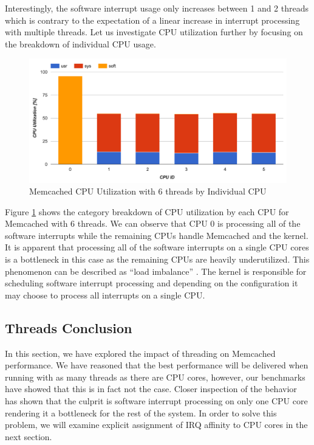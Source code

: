 Interestingly, the software interrupt usage only increases between 1 and 2 threads which is contrary to the expectation of a linear increase in interrupt processing with multiple threads. Let us investigate CPU utilization further by focusing on the breakdown of individual CPU usage.

\begin{figure}[h]
    \includegraphics[width=\textwidth]{./res2/m_threads_cpu_individual.png}
    \caption{Memcached CPU Utilization with 6 threads by Individual CPU}
    \label{fig:m_threads_cpu_individual}
\end{figure}

Figure \ref{fig:m_threads_cpu_individual} shows the category breakdown of CPU utilization by each CPU for Memcached with 6 threads. We can observe that CPU 0 is processing all of the software interrupts while the remaining CPUs handle Memcached and the kernel. It is apparent that processing all of the software interrupts on a single CPU cores is a bottleneck in this case as the remaining CPUs are heavily underutilized. This phenomenon can be described as ``load imbalance'' \cite{leverich2014reconciling}. The kernel is responsible for scheduling software interrupt processing and depending on the configuration it may choose to process all interrupts on a single CPU.

\subsection{Threads Conclusion}
In this section, we have explored the impact of threading on Memcached performance. We have reasoned that the best performance will be delivered when running with as many threads as there are CPU cores, however, our benchmarks have showed that this is in fact not the case. Closer inspection of the behavior has shown that the culprit is software interrupt processing on only one CPU core rendering it a bottleneck for the rest of the system. In order to solve this problem, we will examine explicit assignment of IRQ affinity to CPU cores in the next section.


